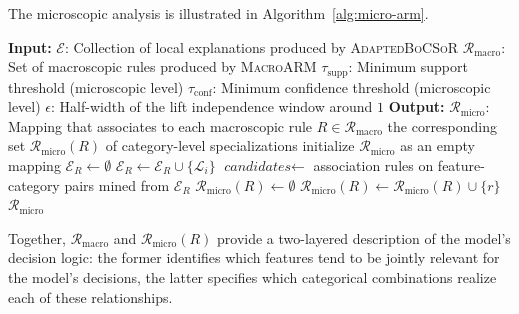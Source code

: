 The microscopic analysis is illustrated in Algorithm~\ref{alg:micro-arm}.

\begin{algorithm}[H]
  \caption{Microscopic Association Rule Analysis}\label{alg:micro-arm}
  \begin{algorithmic}[1]
    \Statex \textbf{Input:}
    \Statex \quad $\mathcal{E}$: Collection of local explanations produced by \textsc{AdaptedBoCSoR}
    \Statex \quad $\mathcal{R}_{\mathrm{macro}}$: Set of macroscopic rules produced by \textsc{MacroARM}
    \Statex \quad $\tau_{\mathrm{supp}}$: Minimum support threshold (microscopic level)
    \Statex \quad $\tau_{\mathrm{conf}}$: Minimum confidence threshold (microscopic level)
    \Statex \quad $\epsilon$: Half-width of the lift independence window around $1$
    \Statex \textbf{Output:}
    \Statex \quad $\mathcal{R}_{\mathrm{micro}}$: Mapping that associates to each macroscopic rule $R \in \mathcal{R}_{\mathrm{macro}}$ the corresponding set $\mathcal{R}_{\mathrm{micro}}(R)$ of category-level specializations
      \State initialize $\mathcal{R}_{\mathrm{micro}}$ as an empty mapping 
        \State $\mathcal{E}_R \gets \emptyset$ 
           
            \State $\mathcal{E}_R \gets \mathcal{E}_R \cup \{\mathcal{L}_i\}$ 
          \EndIf
        \EndFor
        \State $\textit{candidates} \gets$ association rules on feature-category pairs mined from $\mathcal{E}_R$ 
        \State $\mathcal{R}_{\mathrm{micro}}(R) \gets \emptyset$ 
            \State $\mathcal{R}_{\mathrm{micro}}(R) \gets \mathcal{R}_{\mathrm{micro}}(R) \cup \{r\}$ 
          \EndIf
        \EndFor
      \EndFor
      \State \Return $\mathcal{R}_{\mathrm{micro}}$
    \EndProcedure
  \end{algorithmic}
\end{algorithm}

Together, $\mathcal{R}_{\mathrm{macro}}$ and $\mathcal{R}_{\mathrm{micro}}(R)$ provide a two-layered description of the model's decision logic: the former identifies which features tend to be jointly relevant for the model's decisions, the latter specifies which categorical combinations realize each of these relationships.